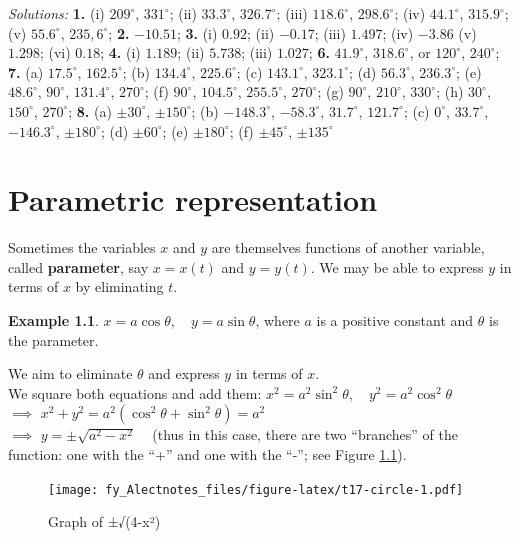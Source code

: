 \documentclass[
  12pt,
  oneside]{book}
\theoremstyle{definition}
\theoremstyle{definition}
\newtheorem{example}{Example}[chapter]
\theoremstyle{definition}
\theoremstyle{definition}
\theoremstyle{remark}
\begin{document}
\emph{Solutions:}
\textbf{1.} (i) \(209^\circ\), \(331^\circ\);
(ii) \(33.3^\circ\), \(326.7^\circ\);
(iii) \(118.6^\circ\), \(298.6^\circ\);
(iv) \(44.1^\circ\), \(315.9^\circ\);
(v) \(55.6^\circ\), \(235,6^\circ\);
\textbf{2.} \(-10.51\);
\textbf{3.} (i) \(0.92\);
(ii) \(-0.17\);
(iii) \(1.497\);
(iv) \(-3.86\)
(v) \(1.298\);
(vi) \(0.18\);
\textbf{4.} (i) \(1.189\);
(ii) \(5.738\);
(iii) \(1.027\);
\textbf{6.} \(41.9^\circ\), \(318.6^\circ\), or \(120^\circ\), \(240^\circ\);
\textbf{7.} (a) \(17.5^\circ\), \(162.5^\circ\);
(b) \(134.4^\circ\), \(225.6^\circ\);
(c) \(143.1^\circ\), \(323.1^\circ\);
(d) \(56.3^\circ\), \(236.3^\circ\);
(e) \(48.6^\circ\), \(90^\circ\), \(131.4^\circ\), \(270^\circ\);
(f) \(90^\circ\), \(104.5^\circ\), \(255.5^\circ\), \(270^\circ\);
(g) \(90^\circ\), \(210^\circ\), \(330^\circ\);
(h) \(30^\circ\), \(150^\circ\), \(270^\circ\);
\textbf{8.}
(a) \(\pm 30^\circ\), \(\pm150^\circ\);
(b) \(-148.3^\circ\), \(-58.3^\circ\), \(31.7^\circ\), \(121.7^\circ\);
(c) \(0^\circ\), \(33.7^\circ\), \(-146.3^\circ\), \(\pm180^\circ\);
(d) \(\pm 60^\circ\);
(e) \(\pm180^\circ\);
(f) \(\pm45^\circ\), \(\pm135^\circ\)

\chapter{Parametric representation}\label{parametric-representation}

Sometimes the variables \(x\) and \(y\) are themselves functions of another variable, called \textbf{parameter}, say \(x=x(t)\) and \(y=y(t)\). We may be able to express \(y\) in terms of \(x\) by eliminating \(t\).

\begin{example}
\(x=a\cos\theta\), ~ \(y=a\sin\theta\), where \(a\) is a positive constant and \(\theta\) is the parameter.
\end{example}

We aim to eliminate \(\theta\) and express \(y\) in terms of \(x\).\\
We square both equations and add them: \(x^2=a^2\sin^2\theta\), ~ \(y^2=a^2\cos^2\theta\)\\
\(\implies\) \(x^2+y^2=a^2(\cos^2\theta+\sin^2\theta) = a^2\)\\
\(\implies\) \(y=\pm\sqrt{a^2-x^2}\) ~ (thus in this case, there are two ``branches'' of the function: one with the ``+'' and one with the ``-''; see Figure \ref{fig:t17-circle}).

\begin{figure}
\centering
\texttt{[image: fy\_Alectnotes\_files/figure-latex/t17-circle-1.pdf]}
\caption{\label{fig:t17-circle}Graph of ±√(4-x²)}
\end{figure}
\end{document}
